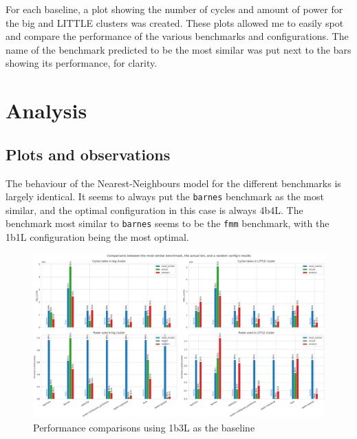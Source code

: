     For each baseline, a plot showing the number of cycles and amount of power 
    for the big and LITTLE clusters was created. These plots allowed me to 
    easily spot and compare the performance of the various benchmarks and 
    configurations. The name of the benchmark predicted to be the most similar
    was put next to the bars showing its performance, for clarity.
    
\section{Analysis}
    \subsection{Plots and observations}
    The behaviour of the Nearest-Neighbours model for the different benchmarks 
    is largely identical. It seems to always put the \texttt{barnes} benchmark
    as the most similar, and the optimal configuration in this case is always
    4b4L. The benchmark most similar to \texttt{barnes} seems to be the 
    \texttt{fmm} benchmark, with the 1b1L configuration being the most optimal.
    \begin{figure}[H]
        \centering
        \includegraphics[width=\textwidth]{pred-plots/stock-2b2L/rand-1b3L.png}
        \caption{Performance comparisons using 1b3L as the baseline}
        \label{fig:s-2b2L-r-1b3L}
    \end{figure}
    
